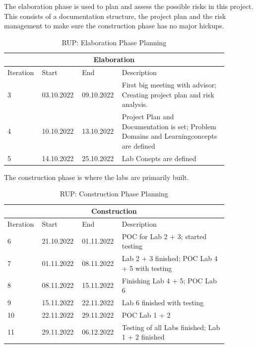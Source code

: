 \noindent The elaboration phase is used to plan and assess the possible risks in this project. This consists of a documentation structure, the project plan and the risk management to make sure the construction phase has no major hickups.
\begin{table}[H]
    \centering
    \begin{tabular}{|p{0.12\linewidth}|p{0.15\linewidth}|p{0.15\linewidth}|p{0.46\linewidth}|}
        \hline
        \multicolumn{4}{||c||}{\textbf{Elaboration}} \\
        \hline \hline
        Iteration & Start & End & Description \\
        \hline \hline
        3 & 03.10.2022 & 09.10.2022 &  First big meeting with advisor; Creating project plan and risk analysis.\\
        \hline
        4 & 10.10.2022 & 13.10.2022 & Project Plan and Documentation is set; Problem Domains and Learningconcepts are defined \\
        \hline
        5 & 14.10.2022 & 25.10.2022 & Lab Conepts are defined \\
        \hline
    \end{tabular}
    \caption{RUP: Elaboration Phase Planning}
    \label{elaboration_table}
\end{table}

\noindent The construction phase is where the labs are primarily built. 
\begin{table}[H]
    \centering
    \begin{tabular}{|p{0.12\linewidth}|p{0.15\linewidth}|p{0.15\linewidth}|p{0.46\linewidth}|}
        \hline
        \multicolumn{4}{||c||}{\textbf{Construction}} \\
        \hline \hline
        Iteration & Start & End & Description \\
        \hline \hline
        6 & 21.10.2022 & 01.11.2022 & POC for Lab 2 + 3; started testing \\
        \hline
        7 & 01.11.2022 & 08.11.2022 & Lab 2 + 3 finished; POC Lab 4 + 5 with testing \\
        \hline
        8 & 08.11.2022 & 15.11.2022 & Finishing Lab 4 + 5; POC Lab 6 \\
        \hline
        9 & 15.11.2022 & 22.11.2022 & Lab 6 finished with testing \\
        \hline
        10 & 22.11.2022 & 29.11.2022 & POC Lab 1 + 2 \\
        \hline
        11 & 29.11.2022 & 06.12.2022 & Testing of all Labs finished; Lab 1 + 2 finished \\
        \hline
    \end{tabular}
    \caption{RUP: Construction Phase Planning}
    \label{construction_table}
\end{table}


